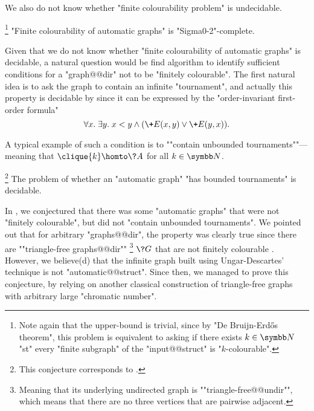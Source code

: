 We also do not know whether "finite colourability problem" is undecidable.
\begin{conjecture}
	\!\footnote{Note again that the upper-bound is trivial, since by "De Bruijn-Erdős theorem",
	this problem is equivalent to asking if there exists $k\in \N$ "st"
	every "finite subgraph" of the "input@@struct" is "$k$-colourable".}
	\AP\label{conj:finite-colourability-undecidable}
	"Finite colourability of automatic graphs" is "Sigma0-2"-complete.
\end{conjecture}

Given that we do not know whether "finite colourability of automatic graphs"
is decidable, a natural question would be find algorithm to identify sufficient conditions
for a "graph@@dir" not to be "finitely colourable".
The first natural idea is to ask the graph to contain an infinite "tournament",
and actually this property is decidable by 
since it can be expressed by the "order-invariant first-order formula"
\[\forall x.\;\exists y.\; x < y \land (\+E(x,y) \lor \+E(y,x)).\]

A typical example of such a condition
is to \AP""contain unbounded tournaments""---meaning that $\clique{k} \homto \?A$ for all $k\in\N$.

\begin{conjecture}
	\!\footnote{This conjecture corresponds to \cite[Conjecture 7.3]{BarceloFigueiraMorvan2023SeparatingAutomatic}.}
	\AP\label{conj:unbounded-cliques}
    The problem of whether an "automatic graph" "has bounded tournaments" is decidable.
\end{conjecture}

In \cite[Conjecture 7.2]{BarceloFigueiraMorvan2023SeparatingAutomatic}, we conjectured
that there was some "automatic graphs" that were not "finitely colourable",
but did not "contain unbounded tournaments".
We pointed out that for arbitrary "graphs@@dir", the property was clearly true 
since there are \AP""triangle-free graphs@@dir""%
\footnote{Meaning that its underlying undirected graph is \AP""triangle-free@@undir"",
which means that there are no three vertices that are pairwise adjacent.}
$\?G$ that are not finitely colourable \cite{UngarDescartes1954ChromaticGraphs}.
However, we believe(d) that the infinite graph built using Ungar-Descartes' technique
is not "automatic@@struct".
Since then, we managed to prove this conjecture, by relying on another classical construction of
triangle-free graphs with arbitrary large "chromatic number".

